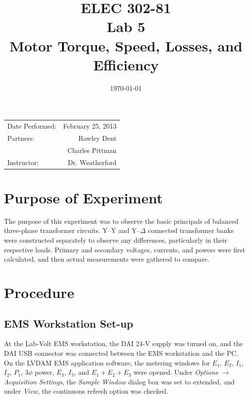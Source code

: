 \documentclass{article}
\author{}
\title{ELEC 302-81\\ Lab 5\\ Motor Torque, Speed, Losses, and Efficiency}
\date{\today}
\begin{document}
\maketitle

\begin{center}
  \begin{tabular}{lr}
    Date Performed: & February 25, 2013 \\
    Partners: & Rawley Dent \\
              & Charles Pittman \\
    Instructor: & Dr. Weatherford
  \end{tabular}
\end{center}

\pagebreak

\setlength\parindent{0pt}

\section{Purpose of Experiment}

The purpose of this experiment was to observe the basic principals of balanced
three-phase transformer circuits. Y--Y and Y--$\Delta$ connected transformer
banks were constructed separately to observe any differences, particularly in
their respective loads. Primary and secondary voltages, currents, and powers
were first calculated, and then actual measurements were gathered to compare.

\section{Procedure}
\subsection{EMS Workstation Set-up}
At the Lab-Volt EMS workstation, the DAI 24-V supply was turned on, and the DAI
USB connector was connected between the EMS workstation and the {PC}. On the
LVDAM EMS application software, the metering windows for $E_1$, $E_2$, $I_1$,
$I_2$, $P_1$, 3$\phi$ power, $E_3$, $I_3$, and $E_1 + E_2 + E_3$ were opened.
Under \emph{Options $\to$ Acquisition Settings}, the \emph{Sample Window}
dialog box was set to extended, and under \emph{View}, the continuous refresh
option was checked.
\end{document}
